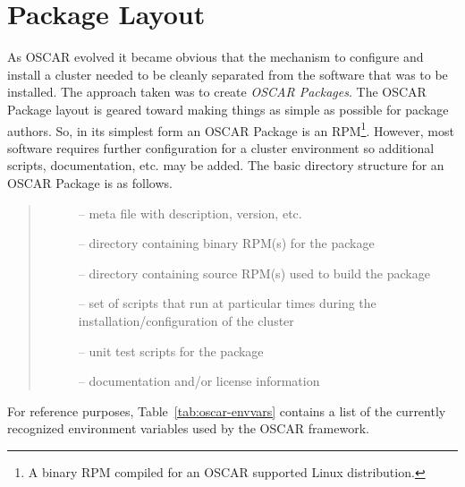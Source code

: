 

\section{Package Layout}
\label{sect:pkg-layout}

As OSCAR evolved it became obvious that the mechanism to configure and
install a cluster needed to be cleanly separated from the software that was
to be installed.  The approach taken was to create \emph{OSCAR Packages}.
The OSCAR Package layout is geared toward making things as simple as
possible for package authors.  So, in its simplest form an OSCAR Package is
an RPM\footnote{A binary RPM compiled for an OSCAR supported Linux
distribution.}.  However, most software requires further configuration for
a cluster environment so additional scripts, documentation, etc. may be
added.  The basic directory structure for an OSCAR Package is as follows.

\begin{quote}
\begin{description}
  \item[] -- meta file with description, version, etc.
  \item[] -- directory containing binary RPM(s) for the package
  \item[] -- directory containing source RPM(s) used to build
                            the package
  \item[] --  set of scripts that run at particular times
                     during the installation/configuration of the cluster
  \item[] -- unit test scripts for the package
  \item[] -- documentation and/or license information
\end{description}
\end{quote}

\noindent For reference purposes, Table~\ref{tab:oscar-envvars}
contains a list of the currently recognized environment variables used by
the OSCAR framework.



